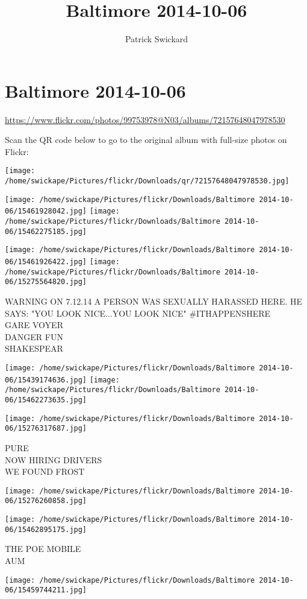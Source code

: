\documentclass[10pt,letterpaper]{article}
\title{Baltimore 2014-10-06}
\author{Patrick Swickard}
\date{}
\begin{document}
\section*{Baltimore 2014-10-06}

\url{https://www.flickr.com/photos/99753978@N03/albums/72157648047978530}

Scan the QR code below to go to the original album with full-size photos on Flickr:

\texttt{[image: /home/swickape/Pictures/flickr/Downloads/qr/72157648047978530.jpg]}
\pagebreak

\texttt{[image: /home/swickape/Pictures/flickr/Downloads/Baltimore 2014-10-06/15461928042.jpg]}
\texttt{[image: /home/swickape/Pictures/flickr/Downloads/Baltimore 2014-10-06/15462275185.jpg]}

\texttt{[image: /home/swickape/Pictures/flickr/Downloads/Baltimore 2014-10-06/15461926422.jpg]}
\texttt{[image: /home/swickape/Pictures/flickr/Downloads/Baltimore 2014-10-06/15275564820.jpg]}

WARNING ON 7.12.14 A PERSON WAS SEXUALLY HARASSED HERE.  HE SAYS: "YOU LOOK NICE...YOU LOOK NICE" \#ITHAPPENSHERE\\
GARE VOYER\\
DANGER FUN\\
SHAKESPEAR
\pagebreak

\texttt{[image: /home/swickape/Pictures/flickr/Downloads/Baltimore 2014-10-06/15439174636.jpg]}
\texttt{[image: /home/swickape/Pictures/flickr/Downloads/Baltimore 2014-10-06/15462273635.jpg]}

\texttt{[image: /home/swickape/Pictures/flickr/Downloads/Baltimore 2014-10-06/15276317687.jpg]}

PURE\\
NOW HIRING DRIVERS\\
WE FOUND FROST
\pagebreak

\texttt{[image: /home/swickape/Pictures/flickr/Downloads/Baltimore 2014-10-06/15276260858.jpg]}

\vspace{0.25in}
\texttt{[image: /home/swickape/Pictures/flickr/Downloads/Baltimore 2014-10-06/15462895175.jpg]}

THE POE MOBILE\\
AUM
\pagebreak

\texttt{[image: /home/swickape/Pictures/flickr/Downloads/Baltimore 2014-10-06/15459744211.jpg]}
\end{document}
